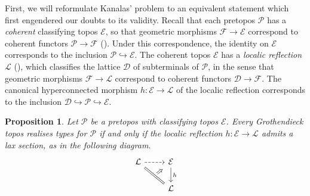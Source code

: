 \documentclass{article}
\theoremstyle{plain}
\newtheorem{prop}[thm]{Proposition}
\theoremstyle{definition}
\newcommand{\dcat}{\mathcal{D}}
\newcommand{\pretopos}{\mathcal{P}}
\newcommand{\topos}{\mathcal{E}}
\newcommand{\ftopos}{\mathcal{F}}
\newcommand{\locrefl}{\mathcal{L}}
\begin{document}
	
	First, we will reformulate Kanalas' problem to an equivalent statement which first engendered our doubts to its validity.  Recall that each pretopos $\pretopos$ has a \emph{coherent} classifying topos $\topos$, so that geometric morphisms $\ftopos \to \topos$ correspond to coherent functors $\pretopos \to \ftopos$ (\cite[\S 8]{makkai_reyes}).  Under this correspondence, the identity on $\topos$ corresponds to the inclusion $\pretopos \hookrightarrow \topos$.  The coherent topos $\topos$ has a \emph{localic reflection} $\locrefl$ (\cite[\S A4.6]{elephant}), which classifies the lattice $\dcat$ of subterminals of $\pretopos$, in the sense that geometric morphisms $\ftopos \to \locrefl$ correspond to coherent functors $\dcat \to \ftopos$.  The canonical hyperconnected morphism $h \colon \topos \to \locrefl$ of the localic reflection corresponds to the inclusion $\dcat \hookrightarrow \pretopos \hookrightarrow \topos$.
	\begin{prop}
		Let $\pretopos$ be a pretopos with classifying topos $\topos$.  Every Grothendieck topos realises types for $\pretopos$ if and only if the localic reflection $h \colon \topos \to \locrefl$ admits a lax section, as in the following diagram.
		\[\begin{tikzcd}
			\locrefl & \topos \\
			& \locrefl
			\arrow[dashed, from=1-1, to=1-2]
			\arrow[""{name=0, anchor=center, inner sep=0}, equals, from=1-1, to=2-2]
			\arrow["h", from=1-2, to=2-2]
			\arrow["\Rightarrow"{marking, allow upside down}, draw=none, from=0, to=1-2]
		\end{tikzcd}\]
	\end{prop}
\end{document}
